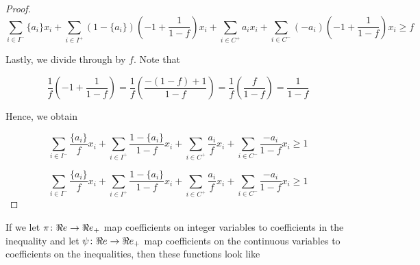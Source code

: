 \begin{proof}
\begin{equation}
\label{eq:gmic-close2}
\sum_{i \in I^{-}} \{a_i\} x_i + \sum_{i \in I^+} (1-\{a_i\})\left(-1+\frac{1}{1-f}\right)x_i + \sum_{i \in C^+} a_i x_i   + \sum_{i \in C^-}(-a_i)\left(-1 + \frac{1}{1-f}\right) x_i \geq f
\end{equation}

Lastly, we divide through by $f$.  Note that

\begin{equation*}
\frac{1}{f} \left(-1+\frac{1}{1-f}\right) = 
\frac{1}{f} \left(\frac{-(1-f) + 1}{1-f}\right) = 
\frac{1}{f} \left(\frac{f}{1-f}\right) = 
\frac{1}{1-f} 
\end{equation*}



Hence, we obtain

\begin{equation*}
\label{eq:gmic-end}
\sum_{i \in I^{-}} \frac{\{a_i\}}{f} x_i + \sum_{i \in I^+} \frac{1-\{a_i\}}{1-f}x_i + 
\sum_{i \in C^+} \frac{a_i}{f} x_i   + \sum_{i \in C^-}\frac{-a_i}{1-f}x_i \geq 1
\end{equation*}

\begin{equation*}
\label{eq:gmic-end}
\sum_{i \in I^{-}} \frac{\{a_i\}}{f} x_i + \sum_{i \in I^+} \frac{1-\{a_i\}}{1-f}x_i + 
\sum_{i \in C^+} \frac{a_i}{f} x_i   + \sum_{i \in C^-}\frac{-a_i}{1-f}x_i \geq 1
\end{equation*}
\end{proof}

If we let $\pi\colon \Re e \to \Re e_+$ map coefficients on integer variables to coefficients in the inequality and let $\psi \colon \Re e \to \Re e_+$ map coefficients on the continuous variables to coefficients on the inequalities, then these functions look like



